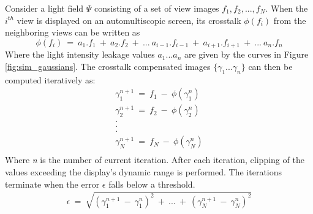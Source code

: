 Consider a light field $\Psi$ consisting of a set of view images ${f_1, f_2, ..., f_N}$. When the $i^{th}$ view is displayed on an automultiscopic screen, its crosstalk $\phi(f_i)$ from the neighboring views can be written as
\begin{equation}
\phi(f_i)\:=\: a_1.f_1\:+\:a_2.f_2\:+\:...\:a_{i-1}.f_{i-1}\:+\:a_{i+1}.f_{i+1}\:+\:...\:a_n.f_n
\end{equation}
Where the light intensity leakage values $a_1...a_n$ are given by the curves in Figure \ref{fig:sim_gaussians}. The crosstalk compensated images $\{\gamma_1...\gamma_n\}$ can then be computed iteratively as:
\begin{equation}
\begin{aligned}
\gamma_1^{n+1} \:=\: f_1 \:-\: \phi(\gamma_1^n) \\
\gamma_2^{n+1} \:=\: f_2 \:-\: \phi(\gamma_2^n) \\
.\:\:\:\:\:\:\:\:\:\:\:\:\:\:\:\:\:\:\:\:\:\:\:\:\:\:\:\:\:\:\:\:\:\:\:\:\:\ \\
.\:\:\:\:\:\:\:\:\:\:\:\:\:\:\:\:\:\:\:\:\:\:\:\:\:\:\:\:\:\:\:\:\:\:\:\:\:\ \\
.\:\:\:\:\:\:\:\:\:\:\:\:\:\:\:\:\:\:\:\:\:\:\:\:\:\:\:\:\:\:\:\:\:\:\:\:\:\ \\
\gamma_N^{n+1} \:=\: f_N \:-\: \phi(\gamma_N^n) \\
\end{aligned}
\end{equation}
Where \emph{n} is the number of current iteration. After each iteration, clipping of the values exceeding the display's dynamic range is performed. The iterations terminate when the error $\epsilon$ falls below a threshold.
\begin{equation}
\begin{aligned}
\epsilon \:=\: \sqrt{(\gamma_1^{n+1}\:-\:\gamma_1^n)^2 \:+\: ...\:+\:(\gamma_N^{n+1}\:-\:\gamma_N^n)^2}
\end{aligned}
\end{equation}

